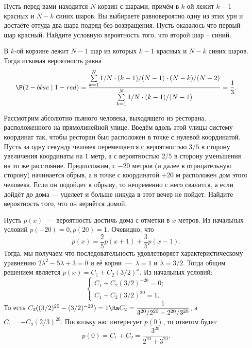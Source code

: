 \begin{problem}
    Пусть перед вами находится $N$ корзин с шарами, причём в $k$-ой лежит $k - 1$ красных и $N - k$ синих шаров.
    Вы выбираете равновероятно одну из этих урн и достаёте оттуда два шара подряд без возвращения.
    Пусть оказалось что первый шар красный.
    Найдите условную вероятность того, что второй шар -- синий.
\end{problem}
\begin{solution}
    В $k$-ой корзине лежит $N - 1$ шар из которых $k - 1$ красных и $N - k$ синих шаров.
    Тогда искомая вероятность равна
    \[
        \P(2 - blue \mid 1 - red) = \dfrac{\sum\limits_{k = 1}^N 1/N \cdot (k - 1)/(N - 1) \cdot (N - k)/(N - 2)}{\sum\limits_{k = 1}^N 1/N \cdot (k - 1)/(N - 1)} = \dfrac{1}{3}.
    \]
\end{solution}
\begin{problem}
    Рассмотрим абсолютно пьяного человека, выходящего из ресторана, расположенного на прямолинейной улице.
    Введём вдоль этой улицы систему координат так, чтобы ресторан был расположен в точке с нулевой координатой.
    Пусть за одну секунду человек перемещается с вероятностью $3/5$ в сторону увеличения координаты на $1$ метр, а с вероятностью $2/5$ в сторону уменьшения на то же расстояние.
    Предположим, с $-20$ метров (и далее в отрицательную сторону) начинается обрыв, а в точке с координатой $+20$ м расположен дом этого человека.
    Если он подойдет к обрыву, то непременно с него свалится, а если дойдёт до дома — уцелеет и больше никуда в этот вечер не пойдет.
    Найдите вероятность того, что он вернётся домой.
\end{problem}
\begin{solution}
    Пусть $p(x)$~---~вероятность достичь дома с отметки в $x$ метров.
    Из начальных условий $p(-20) = 0, p(20) = 1$.
    Очевидно, что \[p(x) = \dfrac{2}{5}p(x + 1) + \dfrac{3}{5}p(x - 1).\]
    Тогда, мы получаем что последовательность удовлетворяет характеристическому уравнению $2\lambda^2 - 5\lambda + 3 = 0$ и её корни~---~$\lambda = 1$ и $\lambda = 3/2$.
    Тогда общим решением является $p(x) = C_1 + C_2(3/2)^x$.
    Из начальных условий:
    \[
        \begin{cases}
            C_1 + C_2(3/2)^{-20} = 0; \\
            C_1 + C_2(3/2)^{20} = 1.
        \end{cases}
    \]
    То есть $C_2((3/2)^{20} - (3/2)^{-20}) = 1 \Ra C_2 = \dfrac{1}{3^{20}/2^{20} - 2^{20}/3^{20}}$,
    а $C_1 = -C_2(2/3)^{20}.$ Поскольку нас интересует $p(0)$, то ответом будет
    \[
        p(0) = C_1 + C_2 = \dfrac{3^{20}}{2^{20} + 3^{20}}.
    \]
\end{solution}
